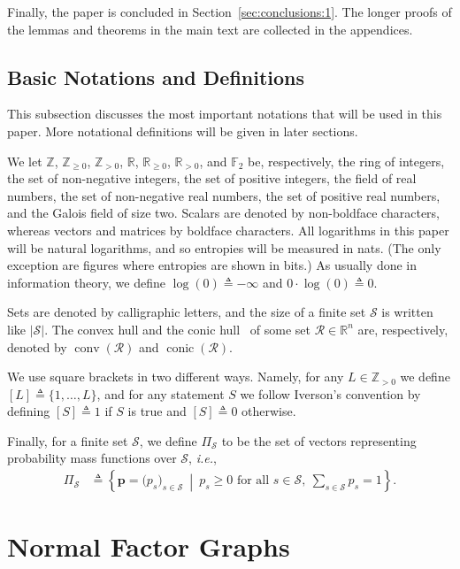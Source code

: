 \documentclass[journal, twocolumn]{IEEEtran}
\renewcommand{\mathbf}[1]{{\bm{#1}}}
\newcommand{\ie}{\emph{i.e.}}
\renewcommand{\geq}{\geqslant}
\newcommand{\R}{\mathbb{R}}
\newcommand{\Rp}{\mathbb{R}_{\geq 0}}
\newcommand{\Rpp}{\mathbb{R}_{>0}}
\newcommand{\Z}{\mathbb{Z}}
\newcommand{\Zp}{\Z_{\geq 0}}
\newcommand{\Zpp}{\Z_{>0}}
\newcommand{\vect}[1]{\mathbf{#1}}
\newcommand{\set}[1]{\mathcal{#1}}
\newcommand{\GF}[1]{\mathbb{F}_{#1}}
\newcommand{\defeq}{\triangleq}
\newcommand{\setR}{\set{R}}
\newcommand{\setS}{\set{S}}
\newcommand{\convhull}{\operatorname{conv}}
\newcommand{\conichull}{\operatorname{conic}}
\newcommand{\card}[1]{\left\lvert #1 \right\rvert}
\newcommand{\?}{\mathrm{?}}
\newcommand{\setPi}{\Pi}
\begin{document}
Finally, the paper is concluded in Section~\ref{sec:conclusions:1}. The longer
proofs of the lemmas and theorems in the main text are collected in the
appendices.


\subsection{Basic Notations and Definitions}
\label{sec:notation:1}


This subsection discusses the most important notations that will be used in
this paper. More notational definitions will be given in later sections.

We let $\Z$, $\Zp$, $\Zpp$, $\R$, $\Rp$, $\Rpp$, and $\GF{2}$ be,
respectively, the ring of integers, the set of non-negative integers, the set
of positive integers, the field of real numbers, the set of non-negative real
numbers, the set of positive real numbers, and the Galois field of size
two. Scalars are denoted by non-boldface characters, whereas vectors and
matrices by boldface characters. All logarithms in this paper will be natural
logarithms, and so entropies will be measured in nats. (The only exception are
figures where entropies are shown in bits.) As usually done in information
theory, we define $\log(0) \defeq -\infty$ and $0 \cdot \log(0) \defeq 0$.

Sets are denoted by calligraphic letters, and the size of a finite set $\setS$
is written like $\card{\setS}$. The convex hull and the conic
hull~\cite{Boyd:Vandenberghe:04:1} of some set $\setR \in \R^n$ are,
respectively, denoted by $\convhull(\setR)$ and $\conichull(\setR)$.

We use square brackets in two different ways. Namely, for any $L \in \Zpp$ we
define $[L] \defeq \{ 1, \ldots, L \}$, and for any statement $S$ we follow
Iverson's convention by defining $[S] \defeq 1$ if $S$ is true and $[S] \defeq
0$ otherwise.

Finally, for a finite set $\setS$, we define $\setPi_{\setS}$ to be the set of
vectors representing probability mass functions over $\setS$, \ie,
\begin{align*}
  \setPi_{\setS}
    &\defeq 
       \left\{
           \vect{p} = \big( p_s \big)_{s \in \setS}
         \ \middle| \ 
           p_s \geq 0 \text{ for all $s \in \setS$}, \ 
           \sum_{s \in \setS} p_s = 1
         \right\}.
\end{align*}



\section{Normal Factor Graphs}
\label{sec:normal:factor:graphs:1}
\end{document}
